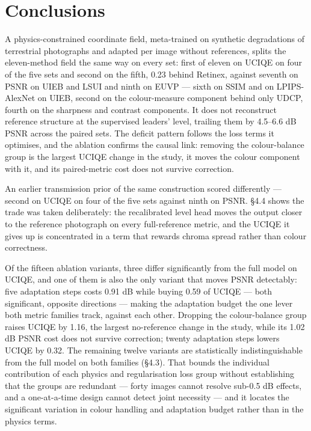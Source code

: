 \documentclass[journal]{IEEEtran}
\begin{document}
\section{Conclusions}
A physics-constrained coordinate field, meta-trained on synthetic degradations of terrestrial photographs and adapted per image without references, splits the eleven-method field the same way on every set: first of eleven on UCIQE on four of the five sets and second on the fifth, 0.23 behind Retinex, against seventh on PSNR on UIEB and LSUI and ninth on EUVP --- sixth on SSIM and on LPIPS-AlexNet on UIEB, second on the colour-measure component behind only UDCP, fourth on the sharpness and contrast components. It does not reconstruct reference structure at the supervised leaders' level, trailing them by 4.5--6.6 dB PSNR across the paired sets. The deficit pattern follows the loss terms it optimises, and the ablation confirms the causal link: removing the colour-balance group is the largest UCIQE change in the study, it moves the colour component with it, and its paired-metric cost does not survive correction.

An earlier transmission prior of the same construction scored differently --- second on UCIQE on four of the five sets against ninth on PSNR. \S{}4.4 shows the trade was taken deliberately: the recalibrated level head moves the output closer to the reference photograph on every full-reference metric, and the UCIQE it gives up is concentrated in a term that rewards chroma spread rather than colour correctness.

Of the fifteen ablation variants, three differ significantly from the full model on UCIQE, and one of them is also the only variant that moves PSNR detectably: five adaptation steps costs 0.91 dB while buying 0.59 of UCIQE --- both significant, opposite directions --- making the adaptation budget the one lever both metric families track, against each other. Dropping the colour-balance group raises UCIQE by 1.16, the largest no-reference change in the study, while its 1.02 dB PSNR cost does not survive correction; twenty adaptation steps lowers UCIQE by 0.32. The remaining twelve variants are statistically indistinguishable from the full model on both families (\S{}4.3). That bounds the individual contribution of each physics and regularisation loss group without establishing that the groups are redundant --- forty images cannot resolve sub-0.5 dB effects, and a one-at-a-time design cannot detect joint necessity --- and it locates the significant variation in colour handling and adaptation budget rather than in the physics terms.
\end{document}
